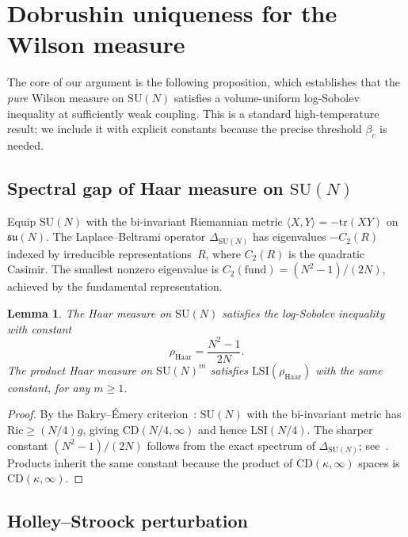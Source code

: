\documentclass[11pt]{article}
\newtheorem{lemma}[theorem]{Lemma}
\theoremstyle{definition}
\theoremstyle{remark}
\newcommand{\su}{\mathfrak{su}}
\newcommand{\SU}{\mathrm{SU}}
\newcommand{\tr}{\mathrm{tr}}
\newcommand{\LSI}{\mathrm{LSI}}
\newcommand{\Haar}{\mathrm{Haar}}
\begin{document}
\section{Dobrushin uniqueness for the Wilson measure}\label{sec:dobrushin}

The core of our argument is the following proposition, which 
establishes that the \emph{pure} Wilson measure on $\SU(N)$ 
satisfies a volume-uniform log-Sobolev inequality at sufficiently 
weak coupling.  This is a standard high-temperature result; we 
include it with explicit constants because the precise threshold 
$\beta_c$ is needed.

\subsection{Spectral gap of Haar measure on $\SU(N)$}

Equip $\SU(N)$ with the bi-invariant Riemannian metric 
$\langle X, Y \rangle = -\tr(XY)$ on $\su(N)$.  The 
Laplace--Beltrami operator $\Delta_{\SU(N)}$ has eigenvalues 
$-C_2(R)$ indexed by irreducible representations~$R$, where 
$C_2(R)$ is the quadratic Casimir.  The smallest nonzero 
eigenvalue is $C_2(\mathrm{fund}) = (N^2-1)/(2N)$, achieved 
by the fundamental representation.

\begin{lemma}\label{lem:haar_lsi}
The Haar measure on $\SU(N)$ satisfies the log-Sobolev inequality 
with constant
\[
  \rho_{\Haar} = \frac{N^2 - 1}{2N}.
\]
The product Haar measure on $\SU(N)^m$ satisfies $\LSI(\rho_{\Haar})$ 
with the same constant, for any $m \geq 1$.
\end{lemma}

\begin{proof}
By the Bakry--\'Emery criterion~\cite{BGL}: $\SU(N)$ with the 
bi-invariant metric has $\mathrm{Ric} \geq (N/4) g$, giving 
$\mathrm{CD}(N/4, \infty)$ and hence $\LSI(N/4)$.  The sharper 
constant $(N^2-1)/(2N)$ follows from the exact spectrum of 
$\Delta_{\SU(N)}$; see~\cite[Thm.~5.7.1]{BGL}.  Products inherit 
the same constant because the product of $\mathrm{CD}(\kappa,\infty)$ 
spaces is $\mathrm{CD}(\kappa,\infty)$.
\end{proof}

\subsection{Holley--Stroock perturbation}
\end{document}
